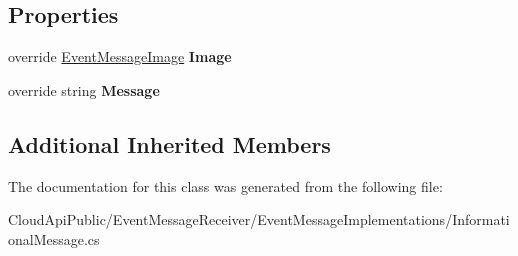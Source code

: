 \subsection*{Properties}
\begin{DoxyCompactItemize}
\item 
\hypertarget{class_cloud_api_public_1_1_event_message_receiver_1_1_informational_message_a3d8d7d0a448afba7df0ca580c7818a60}{override \hyperlink{namespace_cloud_api_public_1_1_static_aefcc1e7e1c81366ec3f6affd41c1f817}{Event\-Message\-Image} {\bfseries Image}}\label{class_cloud_api_public_1_1_event_message_receiver_1_1_informational_message_a3d8d7d0a448afba7df0ca580c7818a60}

\item 
\hypertarget{class_cloud_api_public_1_1_event_message_receiver_1_1_informational_message_a79d8f94b64b3f26e2cd4385f26751c81}{override string {\bfseries Message}}\label{class_cloud_api_public_1_1_event_message_receiver_1_1_informational_message_a79d8f94b64b3f26e2cd4385f26751c81}

\end{DoxyCompactItemize}
\subsection*{Additional Inherited Members}


The documentation for this class was generated from the following file\-:\begin{DoxyCompactItemize}
\item 
Cloud\-Api\-Public/\-Event\-Message\-Receiver/\-Event\-Message\-Implementations/Informational\-Message.\-cs\end{DoxyCompactItemize}
